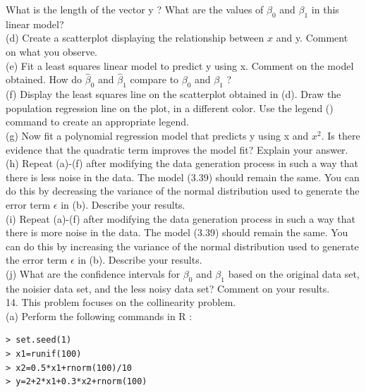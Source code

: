 \documentclass[10pt]{article}
\begin{document}
What is the length of the vector y ? What are the values of $\beta_{0}$ and $\beta_{1}$ in this linear model?\\
(d) Create a scatterplot displaying the relationship between $x$ and y. Comment on what you observe.\\
(e) Fit a least squares linear model to predict y using x. Comment on the model obtained. How do $\hat{\beta}_{0}$ and $\hat{\beta}_{1}$ compare to $\beta_{0}$ and $\beta_{1}$ ?\\
(f) Display the least squares line on the scatterplot obtained in (d). Draw the population regression line on the plot, in a different color. Use the legend () command to create an appropriate legend.\\
(g) Now fit a polynomial regression model that predicts y using x and $x^{2}$. Is there evidence that the quadratic term improves the model fit? Explain your answer.\\
(h) Repeat (a)-(f) after modifying the data generation process in such a way that there is less noise in the data. The model (3.39) should remain the same. You can do this by decreasing the variance of the normal distribution used to generate the error term $\epsilon$ in (b). Describe your results.\\
(i) Repeat (a)-(f) after modifying the data generation process in such a way that there is more noise in the data. The model (3.39) should remain the same. You can do this by increasing the variance of the normal distribution used to generate the error term $\epsilon$ in (b). Describe your results.\\
(j) What are the confidence intervals for $\beta_{0}$ and $\beta_{1}$ based on the original data set, the noisier data set, and the less noisy data set? Comment on your results.\\
14. This problem focuses on the collinearity problem.\\
(a) Perform the following commands in R :

\begin{verbatim}
> set.seed(1)
> x1=runif(100)
> x2=0.5*x1+rnorm(100)/10
> y=2+2*x1+0.3*x2+rnorm(100)
\end{verbatim}
\end{document}

